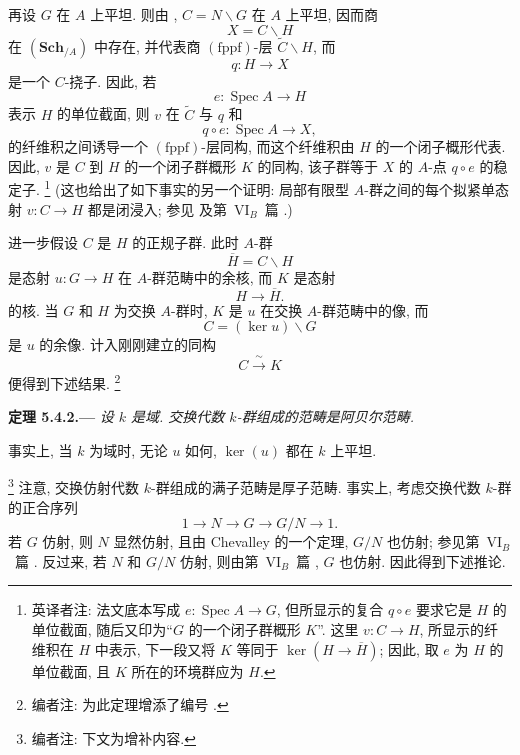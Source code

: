 再设 \(G\) 在 \(A\) 上平坦.
则由 ,
\(C=N\backslash G\) 在 \(A\) 上平坦, 因而商
\[
  X=C\backslash H
\]
在 \((\mathbf{Sch}_{/A})\) 中存在,
并代表商 \((\mathrm{fppf})\)-层 \(\widetilde C\backslash H\), 而
\[
  q:H\longrightarrow X
\]
是一个 \(C\)-挠子.
因此, 若
\[
  e:\operatorname{Spec}A\longrightarrow H
\]
表示 \(H\) 的单位截面, 则 \(v\) 在 \(\widetilde C\)
与 \(q\) 和
\[
  q\circ e:\operatorname{Spec}A\longrightarrow X,
\]
的纤维积之间诱导一个 \((\mathrm{fppf})\)-层同构,
而这个纤维积由 \(H\) 的一个闭子概形代表.
因此, \(v\) 是 \(C\) 到 \(H\) 的一个闭子群概形 \(K\) 的同构,
该子群等于 \(X\) 的 \(A\)-点 \(q\circ e\) 的稳定子.%
\begingroup
\renewcommand{\thefootnote}{\fnsymbol{footnote}}%
\footnote[1]{\label{note:sga3-VIA-5.4-K-ambient}英译者注:
法文底本写成 \(e:\operatorname{Spec}A\to G\),
但所显示的复合 \(q\circ e\) 要求它是 \(H\) 的单位截面,
随后又印为“\(G\) 的一个闭子群概形 \(K\)”.
这里 \(v:C\to H\), 所显示的纤维积在 \(H\) 中表示,
下一段又将 \(K\) 等同于 \(\ker(H\to\overline H)\);
因此, 取 \(e\) 为 \(H\) 的单位截面, 且 \(K\) 所在的环境群应为 \(H\).}%
\endgroup{}
(这也给出了如下事实的另一个证明: 局部有限型 \(A\)-群之间的每个拟紧单态射
\(v:C\to H\) 都是闭浸入; 参见 
及第~VI\(_B\)~篇 .)

进一步假设 \(C\) 是 \(H\) 的正规子群. 此时 \(A\)-群
\[
  \overline H=C\backslash H
\]
是态射 \(u:G\to H\) 在 \(A\)-群范畴中的余核,
而 \(K\) 是态射
\[
  H\longrightarrow\overline H.
\]
的核. 当 \(G\) 和 \(H\) 为交换 \(A\)-群时,
\(K\) 是 \(u\) 在交换 \(A\)-群范畴中的像, 而
\[
  C=(\ker u)\backslash G
\]
是 \(u\) 的余像. 计入刚刚建立的同构
\[
  C\xrightarrow{\ \sim\ }K
\]
便得到下述结果.%
\footnote[53]{\label{note:sga3-VIA-53b}编者注: 为此定理增添了编号
.}

\medskip
{}\label{thm:sga3-VIA-5.4.2}%
\noindent\textbf{定理 5.4.2.---}
\emph{设 \(k\) 是域. 交换代数 \(k\)-群组成的范畴是阿贝尔范畴.}

事实上, 当 \(k\) 为域时, 无论 \(u\) 如何,
\(\ker(u)\) 都在 \(k\) 上平坦.

\noindent
\footnote{\label{note:sga3-VIA-54}编者注: 下文为增补内容.}
注意, 交换仿射代数 \(k\)-群组成的满子范畴是厚子范畴.
事实上, 考虑交换代数 \(k\)-群的正合序列
\[
  1\longrightarrow N\longrightarrow G\longrightarrow
  G/N\longrightarrow 1.
\]
若 \(G\) 仿射, 则 \(N\) 显然仿射,
且由 Chevalley 的一个定理, \(G/N\) 也仿射;
参见第~VI\(_B\)~篇 .
反过来, 若 \(N\) 和 \(G/N\) 仿射, 则由第~VI\(_B\)~篇
, \(G\) 也仿射.
因此得到下述推论.

